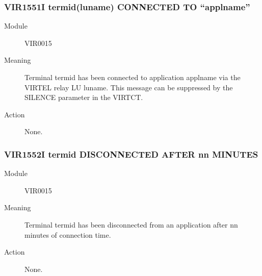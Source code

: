 \documentclass[letterpaper,10pt,english]{sphinxmanual}
\begin{document}
\begin{sphinxVerbatim}[commandchars=\\\{\}]
           
                            
                                    
                                       
\end{sphinxVerbatim}


\subsubsection{VIR1551I termid(luname) CONNECTED TO “applname”}
\label{\detokenize{messages:vir1551i-termid-luname-connected-to-applname}}\begin{description}
\item[{Module}] \leavevmode
VIR0015

\item[{Meaning}] \leavevmode
Terminal termid has been connected to application applname via the VIRTEL relay LU luname. This message can be suppressed by the SILENCE parameter in the VIRTCT.

\item[{Action}] \leavevmode
None.

\end{description}


\subsubsection{VIR1552I termid DISCONNECTED AFTER nn MINUTES}
\label{\detokenize{messages:vir1552i-termid-disconnected-after-nn-minutes}}\begin{description}
\item[{Module}] \leavevmode
VIR0015

\item[{Meaning}] \leavevmode
Terminal termid has been disconnected from an application after nn minutes of connection time.

\item[{Action}] \leavevmode
None.

\end{description}
\end{document}
